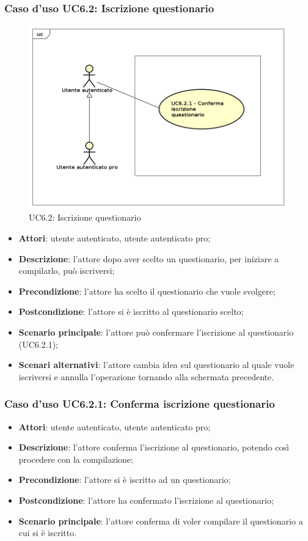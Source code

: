 \subsubsection{Caso d'uso UC6.2: Iscrizione questionario}
\label{UC6.2}
\begin{figure}[h]
\centering
\includegraphics[scale=0.5,keepaspectratio]{UML/UC6_2.png}
\caption{UC6.2: Iscrizione questionario}
\end{figure}
\FloatBarrier
\begin{itemize}
\item\textbf{Attori}: utente autenticato, utente autenticato pro;
\item\textbf{Descrizione}: l'attore dopo aver scelto un questionario, per iniziare a compilarlo, può iscriversi;
\item\textbf{Precondizione}: l'attore ha scelto il questionario che vuole svolgere;
\item\textbf{Postcondizione}: l'attore si è iscritto al questionario scelto;
\item\textbf{Scenario principale}: l'attore può confermare l'iscrizione al questionario (UC6.2.1);
\item\textbf{Scenari alternativi}: l'attore cambia idea sul questionario al quale vuole iscriversi e annulla l'operazione tornando alla schermata precedente.
\end{itemize}

\subsubsection{Caso d'uso UC6.2.1: Conferma iscrizione questionario}
\label{UC6.2.1}
\begin{itemize}
\item\textbf{Attori}: utente autenticato, utente autenticato pro;
\item\textbf{Descrizione}: l'attore conferma l'iscrizione al questionario, potendo così procedere con la compilazione;
\item\textbf{Precondizione}: l'attore si è iscritto ad un questionario;
\item\textbf{Postcondizione}: l'attore ha confermato l'iscrizione al questionario;
\item\textbf{Scenario principale}: l'attore conferma di voler compilare il questionario a cui si è iscritto.
\end{itemize}

